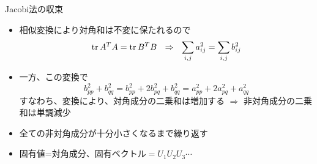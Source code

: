\begin{frame}[t,fragile]{Jacobi法の収束}
  \begin{itemize}
  \item 相似変換により対角和は不変に保たれるので
    \[
      {\rm tr} \, A^T A = {\rm tr} \, B^T B \ \ \Rightarrow \ \
      \sum_{i,j} a_{ij}^2 = \sum_{i,j} b_{ij}^2
    \]
  \item 一方、この変換で
    \[
    b_{pp}^2 + b_{qq}^2 = b_{pp}^2 + 2 b_{pq}^2 + b_{qq}^2 = a_{pp}^2 + 2 a_{pq}^2 + a_{qq}^2
    \]
    すなわち、変換により、対角成分の二乗和は増加する $\Rightarrow$ 非対角成分の二乗和は単調減少
  \item 全ての非対角成分が十分小さくなるまで繰り返す
  \item 固有値=対角成分、固有ベクトル$=U_1 U_2 U_3 \cdots$
  \end{itemize}
\end{frame}
